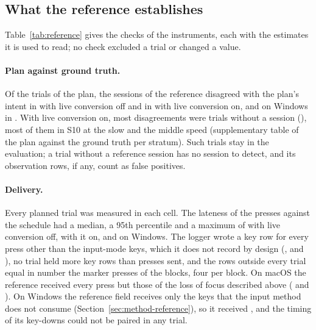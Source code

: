 \subsection{What the reference establishes}
\label{sec:results-reference}

Table~\ref{tab:reference} gives the checks of the instruments, each with the estimates it is used to read; no check
excluded a trial or changed a value.

\paragraph{Plan against ground truth.} Of the trials of the plan, the sessions of the reference disagreed with the
plan's intent in  with live conversion off and in
 with live conversion on, and on Windows in
. With live conversion on, most disagreements were trials without a session
(), most of them in S10 at the slow and the middle speed (supplementary
table of the plan against the ground truth per stratum). Such trials stay in the evaluation; a trial without a
reference session has no session to detect, and its observation rows, if any, count as false positives.

\paragraph{Delivery.} Every planned trial was measured in each cell. The lateness of the presses against the schedule
had a median, a 95th percentile and a maximum of  with live conversion
off,  with it on, and  on Windows.
The logger wrote a key row for every press other than the input-mode keys, which it does not record by design
(,  and
), no trial held more key rows than presses sent, and the rows outside
every trial equal in number the marker presses of the blocks, four per block. On macOS the reference received
every press but those of the loss of focus described above ( and
). On Windows the reference field receives only the keys that the
input method does not consume (Section~\ref{sec:method-reference}), so it received
, and the timing of its key-downs could not be paired in any trial.

